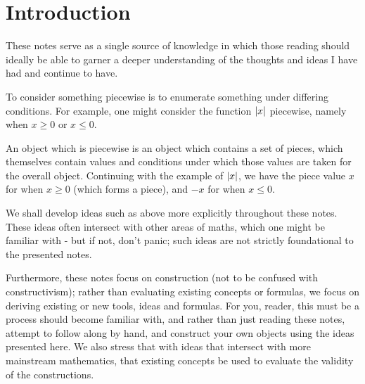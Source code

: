 \section{Introduction}
These notes serve as a single source of knowledge in which those reading should ideally be able to garner a deeper understanding of the thoughts and ideas I have had and continue to have.

To consider something piecewise is to enumerate something under differing conditions. For example, one might consider the function $\abs{x}$ piecewise, namely when $x\geq 0$ or $x\leq 0$.

An object which is piecewise is an object which contains a set of pieces, which themselves contain values and conditions under which those values are taken for the overall object. Continuing with the example of $\abs{x}$, we have the piece value $x$ for when $x\geq 0$ (which forms a piece), and $-x$ for when $x\leq 0$.

We shall develop ideas such as above more explicitly throughout these notes. These ideas often intersect with other areas of maths, which one might be familiar with - but if not, don't panic; such ideas are not strictly foundational to the presented notes. 

Furthermore, these notes focus on construction (not to be confused with constructivism); rather than evaluating existing concepts or formulas, we focus on deriving existing or new tools, ideas and formulas. For you, reader, this must be a process should become familiar with, and rather than just reading these notes, attempt to follow along by hand, and construct your own objects using the ideas presented here. We also stress that with ideas that intersect with more mainstream mathematics, that existing concepts be used to evaluate the validity of the constructions.